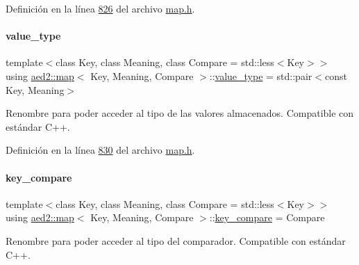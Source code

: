 Definición en la línea \hyperlink{map_8h_source_l00826}{826} del archivo \hyperlink{map_8h_source}{map.\+h}.

\mbox{\label{classaed2_1_1map_a719db98e0ff9a837610f76be33264680_a719db98e0ff9a837610f76be33264680}} 
\paragraph{\texorpdfstring{value\+\_\+type}{value\_type}}
{\footnotesize\ttfamily template$<$class Key, class Meaning, class Compare = std\+::less$<$\+Key$>$$>$ \\
using \hyperlink{classaed2_1_1map}{aed2\+::map}$<$ Key, Meaning, Compare $>$\+::\hyperlink{classaed2_1_1map_a719db98e0ff9a837610f76be33264680_a719db98e0ff9a837610f76be33264680}{value\+\_\+type} =  std\+::pair$<$const Key, Meaning$>$}



Renombre para poder acceder al tipo de las valores almacenados. Compatible con estándar C++. 



Definición en la línea \hyperlink{map_8h_source_l00830}{830} del archivo \hyperlink{map_8h_source}{map.\+h}.

\mbox{\label{classaed2_1_1map_a3efa081d3379ab76f33a5ef9fe697523_a3efa081d3379ab76f33a5ef9fe697523}} 
\paragraph{\texorpdfstring{key\+\_\+compare}{key\_compare}}
{\footnotesize\ttfamily template$<$class Key, class Meaning, class Compare = std\+::less$<$\+Key$>$$>$ \\
using \hyperlink{classaed2_1_1map}{aed2\+::map}$<$ Key, Meaning, Compare $>$\+::\hyperlink{classaed2_1_1map_a3efa081d3379ab76f33a5ef9fe697523_a3efa081d3379ab76f33a5ef9fe697523}{key\+\_\+compare} =  Compare}



Renombre para poder acceder al tipo del comparador. Compatible con estándar C++. 



